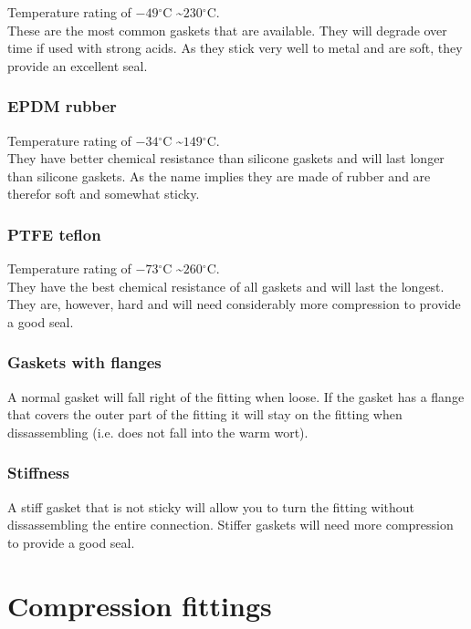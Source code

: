 \documentclass[11pt,fleqn]{book} %
\newcommand{\degree}{\ensuremath{^\circ}}
\begin{document}
Temperature rating of $-49\degree$C \textasciitilde $230\degree$C.\\
These are the most common gaskets that are available. They will degrade over time if used with strong acids. As they stick very well to metal and are soft, they provide an excellent seal.

\subsubsection{EPDM rubber}

Temperature rating of $-34\degree$C \textasciitilde $149\degree$C.\\
They have better chemical resistance than silicone gaskets and will last longer than silicone gaskets. As the name implies they are made of rubber and are therefor soft and somewhat sticky.

\subsubsection{PTFE teflon}

Temperature rating of $-73\degree$C \textasciitilde $260\degree$C.\\
They have the best chemical resistance of all gaskets and will last the longest. They are, however, hard and will need considerably more compression to provide a good seal.

\subsubsection{Gaskets with flanges}

A normal gasket will fall right of the fitting when loose. If the gasket has a flange that covers the outer part of the fitting it will stay on the fitting when dissassembling (i.e. does not fall into the warm wort).

\subsubsection{Stiffness}

A stiff gasket that is not sticky will allow you to turn the fitting without dissassembling the entire connection. Stiffer gaskets will need more compression to provide a good seal.

\section{Compression fittings}
\end{document}
